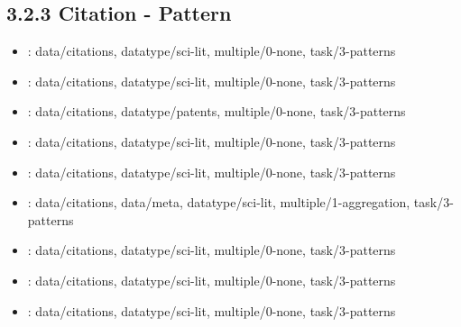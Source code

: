 \begin {refsection}
\section [3.2.3 Citation - Pattern] {3.2.3 Citation - Pattern}

\begin {itemize}
\item \cite {eck-2009-software-survey:-vosviewer-a-computer-program}:
    data/citations, datatype/sci-lit, multiple/0-none, task/3-patterns


\item \cite {noel-2003-co-citation-count-vs-correlation-for-influence-network}:
    data/citations, datatype/sci-lit, multiple/0-none, task/3-patterns


\item \cite {boyack-2000-analysis-of-patent-databases-using-vxinsight}:
    data/citations, datatype/patents, multiple/0-none, task/3-patterns


\item \cite {shi-2015-vegas:-visual-influence-graph-summarization}:
    data/citations, datatype/sci-lit, multiple/0-none, task/3-patterns


\item \cite {zhang-2009-visualizing-the-intellectual-structure-with-paper-reference}:
    data/citations, datatype/sci-lit, multiple/0-none, task/3-patterns


\item \cite {rosvall-2008-maps-of-random-walks-on-complex-networks}:
    data/citations, data/meta, datatype/sci-lit, multiple/1-aggregation, task/3-patterns


\item \cite {delest-2004-exploring-infovis-publication-history-with}:
    data/citations, datatype/sci-lit, multiple/0-none, task/3-patterns


\item \cite {brandes-2002-visualization-of-bibliographic-networks-with-a-reshaped}:
    data/citations, datatype/sci-lit, multiple/0-none, task/3-patterns


\item \cite {chen-2003-visualizing-evolving-networks:-minimum-spanning}:
    data/citations, datatype/sci-lit, multiple/0-none, task/3-patterns


\end {itemize}
\printbibliography
\end {refsection}\pagebreak

